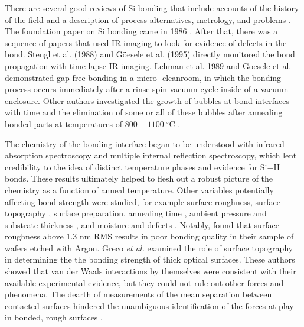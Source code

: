 There are several good reviews of Si bonding that include accounts of the history of the field and a description of process alternatives, metrology, and problems \cite{1998AnRMS..28..215G,Masteika2014}.  The foundation paper on Si bonding came in 1986 \cite{1986JAP....60.2987S}. After that, there was a sequence of papers that used IR imaging to look for evidence of defects in the bond. Stengl et al. (1988) and G{\"o}esele et al. (1995) \cite{1988JaJAP..27L2364S, 1995ApPhL..67.3614G} directly monitored the bond propagation with time-lapse IR imaging. Lehman et al. 1989 and Goesele et al. \cite{1989JaJAP..28L2141L, 1995ApPhL..67.3614G} demonstrated gap-free bonding in a micro- cleanroom, in which the bonding process occurs immediately after a rinse-spin-vacuum cycle inside of a vacuum enclosure.  Other authors investigated the growth of bubbles at bond interfaces with time and the elimination of some or all of these bubbles after annealing bonded parts at temperatures of $800-1100\;^\circ$C \cite{Horn2009, Masteika2014}.

The chemistry of the bonding interface began to be understood with infrared absorption spectroscopy and multiple internal reflection spectroscopy\cite{feijoo1994}, which lent credibility to the idea of distinct temperature phases and evidence for Si$-$H bonds\cite{1995ApPhA..61..101R}.  These results ultimately helped to flesh out a robust picture of the chemistry as a function of anneal temperature\cite{1996JaJAP..35.2102R, 1998AnRMS..28..215G}.  Other variables potentially affecting bond strength were studied, for example surface roughness\cite{JJAP.37.4197}, surface topography \cite{2001JOptA...3...85G}, surface preparation\cite{1996ApPhL..68.2222T}, annealing time \cite{2000JAP....88.4404H}, ambient pressure and substrate thickness \cite{1995ApPhL..67..863G, 2007ApOpt..46.6793H}, and moisture and defects \cite{2001JAP....89.6013L}.  Notably, \cite{JJAP.37.4197} found that surface roughness above 1.3 nm RMS results in poor bonding quality in their sample of wafers etched with Argon.  Greco \emph{et al.} examined the role of surface topography in determining the the bonding strength of thick optical surfaces.  These authors showed that van der Waals interactions by themselves were consistent with their available experimental evidence, but they could not rule out other forces and phenomena.  The dearth of measurements of the mean separation between contacted surfaces hindered the unambiguous identification of the forces at play in bonded, rough surfaces \cite{2001JOptA...3...85G}.


